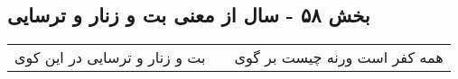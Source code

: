 \begin{center}
\section*{بخش ۵۸ - سال از معنی بت و زنار و ترسایی}
\label{sec:sh058}
\begin{longtable}{l p{0.5cm} r}
بت و زنار و ترسایی در این کوی
&&
همه کفر است ورنه چیست بر گوی
\\
\end{longtable}
\end{center}
